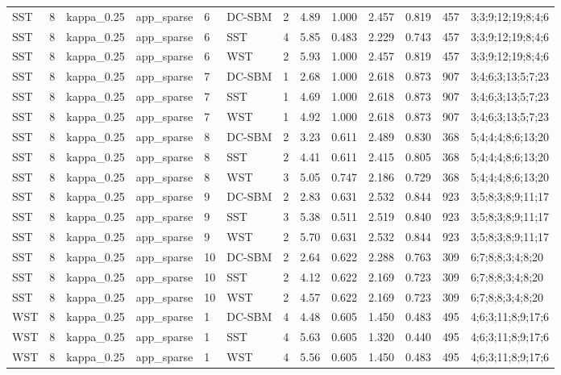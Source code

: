 \begin{table}[!h]
\begin{tabular}[t]{lllllllllllll}
SST & 8 & kappa_0.25 & app_sparse & 6 & DC-SBM & 2 & 4.89 & 1.000 & 2.457 & 0.819 & 457 & 3;3;9;12;19;8;4;6\\
SST & 8 & kappa_0.25 & app_sparse & 6 & SST & 4 & 5.85 & 0.483 & 2.229 & 0.743 & 457 & 3;3;9;12;19;8;4;6\\
SST & 8 & kappa_0.25 & app_sparse & 6 & WST & 2 & 5.93 & 1.000 & 2.457 & 0.819 & 457 & 3;3;9;12;19;8;4;6\\
SST & 8 & kappa_0.25 & app_sparse & 7 & DC-SBM & 1 & 2.68 & 1.000 & 2.618 & 0.873 & 907 & 3;4;6;3;13;5;7;23\\
SST & 8 & kappa_0.25 & app_sparse & 7 & SST & 1 & 4.69 & 1.000 & 2.618 & 0.873 & 907 & 3;4;6;3;13;5;7;23\\
SST & 8 & kappa_0.25 & app_sparse & 7 & WST & 1 & 4.92 & 1.000 & 2.618 & 0.873 & 907 & 3;4;6;3;13;5;7;23\\
SST & 8 & kappa_0.25 & app_sparse & 8 & DC-SBM & 2 & 3.23 & 0.611 & 2.489 & 0.830 & 368 & 5;4;4;4;8;6;13;20\\
SST & 8 & kappa_0.25 & app_sparse & 8 & SST & 2 & 4.41 & 0.611 & 2.415 & 0.805 & 368 & 5;4;4;4;8;6;13;20\\
SST & 8 & kappa_0.25 & app_sparse & 8 & WST & 3 & 5.05 & 0.747 & 2.186 & 0.729 & 368 & 5;4;4;4;8;6;13;20\\
SST & 8 & kappa_0.25 & app_sparse & 9 & DC-SBM & 2 & 2.83 & 0.631 & 2.532 & 0.844 & 923 & 3;5;8;3;8;9;11;17\\
SST & 8 & kappa_0.25 & app_sparse & 9 & SST & 3 & 5.38 & 0.511 & 2.519 & 0.840 & 923 & 3;5;8;3;8;9;11;17\\
SST & 8 & kappa_0.25 & app_sparse & 9 & WST & 2 & 5.70 & 0.631 & 2.532 & 0.844 & 923 & 3;5;8;3;8;9;11;17\\
SST & 8 & kappa_0.25 & app_sparse & 10 & DC-SBM & 2 & 2.64 & 0.622 & 2.288 & 0.763 & 309 & 6;7;8;8;3;4;8;20\\
SST & 8 & kappa_0.25 & app_sparse & 10 & SST & 2 & 4.12 & 0.622 & 2.169 & 0.723 & 309 & 6;7;8;8;3;4;8;20\\
SST & 8 & kappa_0.25 & app_sparse & 10 & WST & 2 & 4.57 & 0.622 & 2.169 & 0.723 & 309 & 6;7;8;8;3;4;8;20\\
WST & 8 & kappa_0.25 & app_sparse & 1 & DC-SBM & 4 & 4.48 & 0.605 & 1.450 & 0.483 & 495 & 4;6;3;11;8;9;17;6\\
WST & 8 & kappa_0.25 & app_sparse & 1 & SST & 4 & 5.63 & 0.605 & 1.320 & 0.440 & 495 & 4;6;3;11;8;9;17;6\\
WST & 8 & kappa_0.25 & app_sparse & 1 & WST & 4 & 5.56 & 0.605 & 1.450 & 0.483 & 495 & 4;6;3;11;8;9;17;6\\

\end{tabular}
\end{table}
